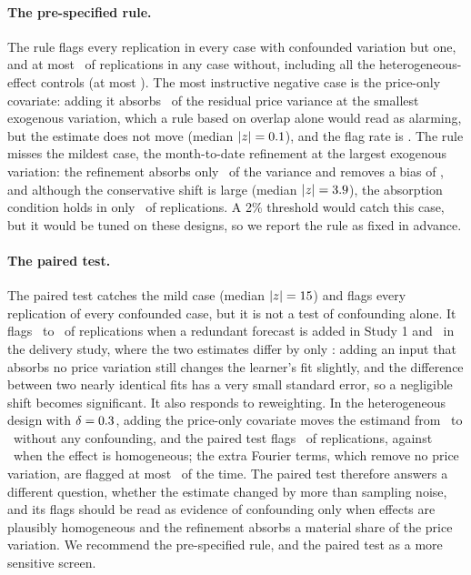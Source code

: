 \documentclass[11pt]{article}
\theoremstyle{remark}
\begin{document}
\paragraph{The pre-specified rule.} The rule flags every replication in every case with confounded variation but one, and at most \DiagPreFPMax\ of replications in any case without, including all the heterogeneous-effect controls (at most \DiagHetPreMax). The most instructive negative case is the price-only covariate: adding it absorbs \DiagPriceOnlyAbsorbed\ of the residual price variance at the smallest exogenous variation, which a rule based on overlap alone would read as alarming, but the estimate does not move (median $|z| = 0.1$), and the flag rate is \DiagPriceOnlyFlag. The rule misses the mildest case, the month-to-date refinement at the largest exogenous variation: the refinement absorbs only \DiagMissAbsorbed\ of the variance and removes a bias of \DiagMissBias, and although the conservative shift is large (median $|z| = 3.9$), the absorption condition holds in only \DiagMissFive\ of replications. A 2\% threshold would catch this case, but it would be tuned on these designs, so we report the rule as fixed in advance.

\paragraph{The paired test.} The paired test catches the mild case (median $|z| = 15$) and flags every replication of every confounded case, but it is not a test of confounding alone. It flags \DiagPairedRedundMin\ to \DiagPairedRedundMax\ of replications when a redundant forecast is added in Study 1 and \DiagPairedDelivery\ in the delivery study, where the two estimates differ by only \DiagDeliveryGap: adding an input that absorbs no price variation still changes the learner's fit slightly, and the difference between two nearly identical fits has a very small standard error, so a negligible shift becomes significant. It also responds to reweighting. In the heterogeneous design with $\delta = 0.3$, adding the price-only covariate moves the estimand from \DiagHetCoarse\ to \DiagHetFine\ without any confounding, and the paired test flags \DiagHetPairedMax\ of replications, against \DiagHetPairedNull\ when the effect is homogeneous; the extra Fourier terms, which remove no price variation, are flagged at most \DiagHetFinerMax\ of the time. The paired test therefore answers a different question, whether the estimate changed by more than sampling noise, and its flags should be read as evidence of confounding only when effects are plausibly homogeneous and the refinement absorbs a material share of the price variation. We recommend the pre-specified rule, and the paired test as a more sensitive screen.
\end{document}
